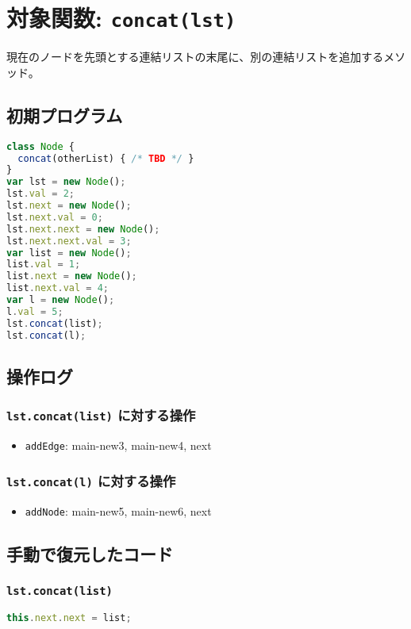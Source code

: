 \documentclass{article}
\begin{document}




\section{対象関数: \texttt{concat(lst)}}
現在のノードを先頭とする連結リストの末尾に、別の連結リストを追加するメソッド。

\subsection{初期プログラム}

\begin{lstlisting}[language=JavaScript]
class Node {
  concat(otherList) { /* TBD */ }
}
var lst = new Node(); 
lst.val = 2;
lst.next = new Node();
lst.next.val = 0;
lst.next.next = new Node(); 
lst.next.next.val = 3;
var list = new Node(); 
list.val = 1;
list.next = new Node();
list.next.val = 4;
var l = new Node();
l.val = 5;
lst.concat(list);
lst.concat(l);
\end{lstlisting}

\subsection{操作ログ}

\subsubsection{\texttt{lst.concat(list)} に対する操作}
\begin{itemize}
  \item \texttt{addEdge}: main-new3, main-new4, next
\end{itemize}

\subsubsection{\texttt{lst.concat(l)} に対する操作}
\begin{itemize}
  \item \texttt{addNode}: main-new5, main-new6, next
\end{itemize}

\subsection{手動で復元したコード}

\subsubsection{\texttt{lst.concat(list)}}
\begin{lstlisting}[language=JavaScript]
this.next.next = list;
\end{lstlisting}
\end{document}
